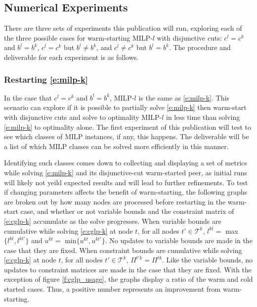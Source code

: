 \documentclass[10pt]{article}
\begin{document}
	\subsection{Numerical Experiments} \label{ss:numerical_experiments}
	There are three sets of experiments this publication will run, exploring each of the three possible cases for warm-starting MILP-$ l $ with disjunctive cuts: $ c^l = c^k $ and $ b^l = b^k $, $ c^l = c^k $ but $ b^l \neq b^k $, and $ c^l \neq c^k $ but $ b^l = b^k $. The procedure and deliverable for each experiment is as follows.
	
	\subsubsection{Restarting \ref{e:milp-k}} \label{sss:restarting_milp_k}
	
	In the case that $ c^l = c^k $ and $ b^l = b^k $, MILP-$ l $ is the same as \ref{e:milp-k}. This scenario can explore if it is possible to partially solve \ref{e:milp-k} then warm-start with disjunctive cuts and solve to optimality MILP-$ l $ in less time than solving \ref{e:milp-k} to optimality alone. The first experiment of this publication will test to see which classes of MILP instances, if any, this happens. The deliverable will be a list of which MILP classes can be solved more efficiently in this manner.
	
	Identifying such classes comes down to collecting and displaying a set of metrics while solving \ref{e:milp-k} and its disjunctive-cut warm-started peer, as initial runs will likely not yeild expected results and will lead to further refinements. To test if changing parameters affects the benefit of warm-starting, the following graphs are broken out by how many nodes are processed before restarting in the warm-start case, and whether or not variable bounds and the constraint matrix of \ref{e:cglp-k} accumulate as the solve progresses. When variable bounds are cumulative while solving \ref{e:cglp-k} at node $ t $, for all nodes $ t' \in \mathcal{T}^k $, $ l^{kt} = $ max$ \{ l^{kt}, l^{kt'} \} $ and $ u^{kt} = $ min$ \{u^{kt}, u^{kt'} \} $. No updates to variable bounds are made in the case that they are fixed. When constraint bounds are cumulative while solving \ref{e:cglp-k} at node $ t $, for all nodes $ t' \in \mathcal{T}^k $, $ \Pi^{t'k} = \Pi^{tk} $. Like the variable bounds, no updates to constraint matrices are made in the case that they are fixed. With the exception of figure \ref{f:cglp_usage}, the graphs display a ratio of the warm and cold started cases. Thus, a positive number represents an improvement from warm-starting.
	
\end{document}
